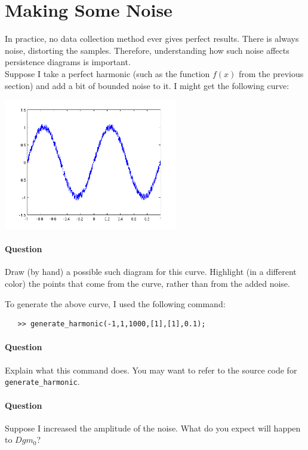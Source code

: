 \documentclass[12pt,twoside]{article}
\newcommand{\qn}{\paragraph*{Question}}
\begin{document}
\section{Making Some Noise}


In practice, no data collection method ever gives perfect results.  There is always noise, distorting the samples.  Therefore, understanding how such noise affects persistence diagrams is important.\\

Suppose I take a perfect harmonic (such as the function $f(x)$ from the previous section) and add a bit of bounded noise to it.  I might get the following curve:

\begin{center}
   \includegraphics[width=3in]{noisysin}
\end{center}

\qn  Draw (by hand) a possible such diagram for this curve.  Highlight (in a different color) the points that come from the curve, rather than from the added noise.\vfill
\pagebreak

To generate the above curve, I used the following command:
\begin{verbatim}
   >> generate_harmonic(-1,1,1000,[1],[1],0.1);
\end{verbatim}

\qn Explain what this command does.  You may want to refer to the source code for \verb|generate_harmonic|.\vspace{0.5in}

\qn Suppose I increased the amplitude of the noise.  What do you expect will happen to $Dgm_0$?\vfill
\end{document}
